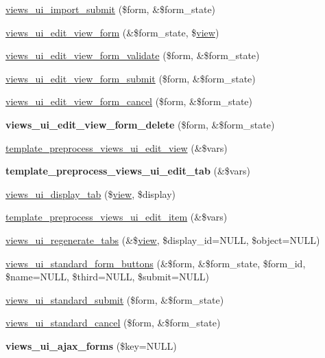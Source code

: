 \begin{CompactItemize}
\item 
\hyperlink{admin_8inc_f208375534e14a238da0f2979bd7c43e}{views\_\-ui\_\-import\_\-submit} (\$form, \&\$form\_\-state)
\item 
\hyperlink{admin_8inc_1272fedcbb93770da96b8da5ec4bc611}{views\_\-ui\_\-edit\_\-view\_\-form} (\&\$form\_\-state, \$\hyperlink{classview}{view})
\item 
\hyperlink{admin_8inc_64c87654d6ff972d3755b11283257766}{views\_\-ui\_\-edit\_\-view\_\-form\_\-validate} (\$form, \&\$form\_\-state)
\item 
\hyperlink{admin_8inc_1175fee9669154b7486a7e2fbfc6efae}{views\_\-ui\_\-edit\_\-view\_\-form\_\-submit} (\$form, \&\$form\_\-state)
\item 
\hyperlink{admin_8inc_c138be787565f55b939741a65574a8ea}{views\_\-ui\_\-edit\_\-view\_\-form\_\-cancel} (\$form, \&\$form\_\-state)
\item 
\hypertarget{admin_8inc_91797216dad6bf2d6ab57172c29f7e4d}{
\textbf{views\_\-ui\_\-edit\_\-view\_\-form\_\-delete} (\$form, \&\$form\_\-state)}
\label{admin_8inc_91797216dad6bf2d6ab57172c29f7e4d}

\item 
\hyperlink{admin_8inc_6f6cfa8a399d4ef25d9dab8f370c90d3}{template\_\-preprocess\_\-views\_\-ui\_\-edit\_\-view} (\&\$vars)
\item 
\hypertarget{admin_8inc_d2fe2b0d582e3708c732e032b27d008a}{
\textbf{template\_\-preprocess\_\-views\_\-ui\_\-edit\_\-tab} (\&\$vars)}
\label{admin_8inc_d2fe2b0d582e3708c732e032b27d008a}

\item 
\hyperlink{admin_8inc_1666f1ec5a2b78fd56d408c129007e43}{views\_\-ui\_\-display\_\-tab} (\$\hyperlink{classview}{view}, \$display)
\item 
\hyperlink{admin_8inc_c6486b2b23fb04adda523126d8eb9a9f}{template\_\-preprocess\_\-views\_\-ui\_\-edit\_\-item} (\&\$vars)
\item 
\hyperlink{admin_8inc_edcac3bc6fcf479946e4fcf5c8a5eb26}{views\_\-ui\_\-regenerate\_\-tabs} (\&\$\hyperlink{classview}{view}, \$display\_\-id=NULL, \$object=NULL)
\item 
\hyperlink{admin_8inc_14c82c16cedbaecf8fb20e1aabc1a15b}{views\_\-ui\_\-standard\_\-form\_\-buttons} (\&\$form, \&\$form\_\-state, \$form\_\-id, \$name=NULL, \$third=NULL, \$submit=NULL)
\item 
\hyperlink{admin_8inc_9af5bfc6978dc754bdfe126ac758deda}{views\_\-ui\_\-standard\_\-submit} (\$form, \&\$form\_\-state)
\item 
\hyperlink{admin_8inc_69c20e73b4a54447f15797c44bdb8344}{views\_\-ui\_\-standard\_\-cancel} (\$form, \&\$form\_\-state)
\item 
\hypertarget{admin_8inc_28d1560f6713eda756f9463d635ba97f}{
\textbf{views\_\-ui\_\-ajax\_\-forms} (\$key=NULL)}
\label{admin_8inc_28d1560f6713eda756f9463d635ba97f}


\end{CompactItemize}

